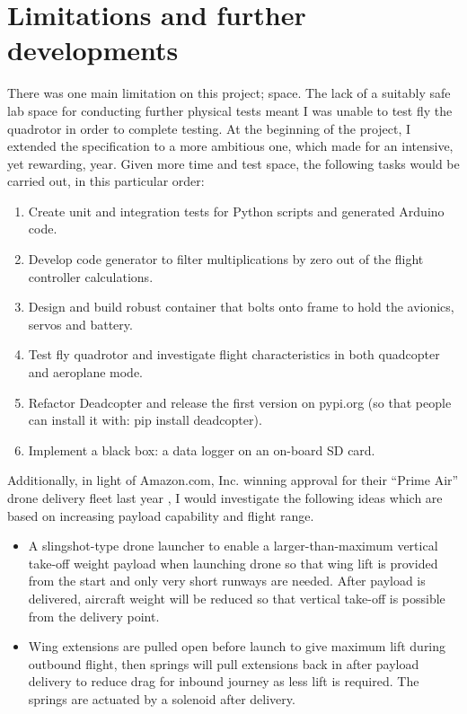 \section{Limitations and further developments}\label{sec:limitations_and_further_developments}
There was one main limitation on this project; space. The lack of a suitably safe lab space for conducting further physical tests meant I was unable to test fly the quadrotor in order to complete testing. At the beginning of the project, I extended the specification to a more ambitious one, which made for an intensive, yet rewarding, year. Given more time and test space, the following tasks would be carried out, in this particular order:
\begin{enumerate}
    \item Create unit and integration tests for Python scripts and generated Arduino code.
    \item Develop code generator to filter multiplications by zero out of the flight controller calculations.
    \item Design and build robust container that bolts onto frame to hold the avionics, servos and battery.
    \item Test fly quadrotor and investigate flight characteristics in both quadcopter and aeroplane mode.
    \item Refactor Deadcopter and release the first version on pypi.org (so that people can install it with: pip install deadcopter).
    \item Implement a black box: a data logger on an on-board SD card.
\end{enumerate}

Additionally, in light of Amazon.com, Inc. winning approval for their ``Prime Air'' drone delivery fleet last year \cite{amazon}, I would investigate the following ideas which are based on increasing payload capability and flight range.
\begin{itemize}
    \item A slingshot-type drone launcher to enable a larger-than-maximum vertical take-off weight payload when launching drone so that wing lift is provided from the start and only very short runways are needed. After payload is delivered, aircraft weight will be reduced so that vertical take-off is possible from the delivery point.
    \item Wing extensions are pulled open before launch to give maximum lift during outbound flight, then springs will pull extensions back in after payload delivery to reduce drag for inbound journey as less lift is required. The springs are actuated by a solenoid after delivery.
\end{itemize}
